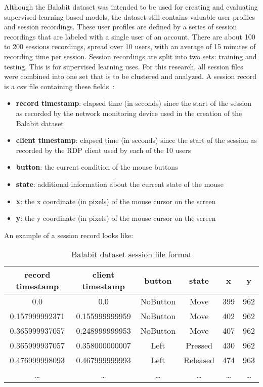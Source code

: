 Although the Balabit dataset was intended to be used for creating and evaluating supervised learning-based models, the dataset still contains valuable user profiles and session recordings.
These user profiles are defined by a series of session recordings that are labeled with a single user of an account.
There are about 100 to 200 sessions recordings, spread over 10 users, with an average of 15 minutes of recording time per session.
Session recordings are split into two sets: training and testing.
This is for supervised learning uses.
For this research, all session files were combined into one set that is to be clustered and analyzed.
A session record is a csv file containing these fields~\cite{balabit_dataset}:
\begin{itemize}
    \item \textbf{record timestamp}: elapsed time (in seconds) since the start of the session as recorded by the network monitoring device used in the creation of the Balabit dataset
    \item \textbf{client timestamp}: elapsed time (in seconds) since the start of the session as recorded by the RDP client used by each of the 10 users
    \item \textbf{button}: the current condition of the mouse buttons
    \item \textbf{state}: additional information about the current state of the mouse
    \item \textbf{x}: the x coordinate (in pixels) of the mouse cursor on the screen
    \item \textbf{y}: the y coordinate (in pixels) of the mouse cursor on the screen
\end{itemize}
An example of a session record looks like:
\begin{table}
    \centering
    \begin{tabular}{ |c|c|c|c|c|c| }
        \hline
        \textbf{record timestamp} & \textbf{client timestamp} & \textbf{button} & \textbf{state} & \textbf{x} & \textbf{y} \\
        \hline
        0.0 & 0.0 & NoButton & Move & 399 & 962 \\
        0.157999992371 & 0.155999999959 & NoButton & Move & 402 & 962 \\
        0.365999937057 & 0.248999999953 & NoButton & Move & 407 & 962 \\
        0.365999937057 & 0.358000000007 & Left & Pressed & 430 & 962 \\
        0.476999998093 & 0.467999999993 & Left & Released & 474 & 963 \\
        \ldots & \ldots & \ldots & \ldots & \ldots & \ldots \\
        \hline
    \end{tabular}
    \caption{Balabit dataset session file format}
    \label{tab:balabit-dataset-format}
\end{table}

